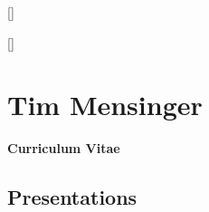 \documentclass[11pt]{article}
\begin{document}
\newpage
\pagestyle{fancy}
\titlespacing*{\section}{0pt}{0pt}{0pt}
\titlespacing*{\subsection}{0pt}{0pt}{0pt}
\titleformat{\section}{\normalfont\Large\bfseries}{\thesection}{1em}{}[{\titlerule[0.8pt]}]
\titleformat{\subsection}{\normalfont\bfseries}{\thesection}{1em}{}[{\titlerule[0.4pt]}]


\section*{\hfill \LARGE Tim Mensinger}\vspace*{3pt}
\hfill\textbf{\large Curriculum Vitae}
\vspace{25pt}


\subsection*{Presentations}
\end{document}
